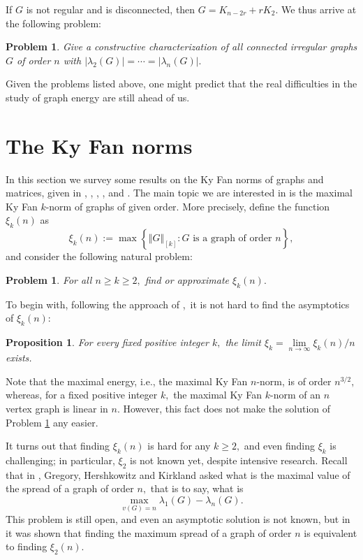 \documentclass[12pt]{article}%
\newtheorem{problem}[theorem]{Problem}
\newtheorem{proposition}[theorem]{Proposition}
\begin{document}
If $G$ is not regular and is disconnected, then $G=K_{n-2r}+rK_{2}.$ We thus
arrive at the following problem:

\begin{problem}
Give a constructive characterization of all connected irregular graphs $G$ of
order $n$ with $\left\vert \lambda_{2}\left(  G\right)  \right\vert
=\cdots=\left\vert \lambda_{n}\left(  G\right)  \right\vert .$
\end{problem}

Given the problems listed above, one might predict that the real difficulties
in the study of graph energy are still ahead of us.

\section{\label{secK}The Ky Fan norms}

In this section we survey some results on the Ky Fan norms of graphs and
matrices, given in \cite{GHK01}, \cite{Nik11c}, \cite{Nik12}, \cite{Nik15b},
and \cite{Nik15c}. The main topic we are interested in is the maximal Ky Fan
$k$-norm of graphs of given order. More precisely, define the function
$\xi_{k}\left(  n\right)  $ as%
\[
\xi_{k}\left(  n\right)  :=\max\left\{  \left\Vert G\right\Vert _{\left[
k\right]  }:G\text{ is a graph of order }n\right\}  ,
\]
and consider the following natural problem:

\begin{problem}
\label{pKF}For all $n\geq k\geq2,$ find or approximate $\xi_{k}\left(
n\right)  .$
\end{problem}

To begin with, following the approach of \cite{Nik06},\ it is not hard to find
the asymptotics of $\xi_{k}\left(  n\right)  $:

\begin{proposition}
For every fixed positive integer $k,$ the limit $\xi_{k}=\lim
\limits_{n\rightarrow\infty}\xi_{k}\left(  n\right)  /n$ exists.
\end{proposition}

Note that the maximal energy, i.e., the maximal Ky Fan $n$-norm, is of order
$n^{3/2},$ whereas, for a fixed positive integer $k,$ the maximal Ky Fan
$k$-norm of an $n$ vertex graph is linear in $n.$ However, this fact does not
make the solution of Problem \ref{pKF} any easier.

It turns out that finding $\xi_{k}\left(  n\right)  $ is hard for any
$k\geq2,$ and even finding $\xi_{k}$ is challenging; in particular, $\xi_{2}$
is not known yet, despite intensive research. Recall that in \cite{GHK01},
Gregory, Hershkowitz and Kirkland asked what is the maximal value of the
spread of a graph of order $n,$ that is to say, what is
\[
\max_{v\left(  G\right)  =n}\lambda_{1}\left(  G\right)  -\lambda_{n}\left(
G\right)  .
\]
This problem is still open, and even an asymptotic solution is not known, but
in \cite{Nik11c} it was shown that finding the maximum spread of a graph of
order $n$ is equivalent to finding $\xi_{2}\left(  n\right)  $.\medskip
\end{document}
